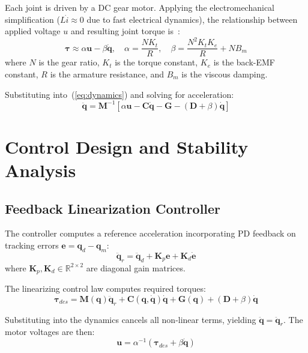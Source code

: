 \documentclass[conference]{IEEEtran}
\begin{document}
Each joint is driven by a DC gear motor. Applying the electromechanical simplification ($L\dot{i} \approx 0$ due to fast electrical dynamics), the relationship between applied voltage $u$ and resulting joint torque is~\cite{siciliano2009}:
\begin{equation}
\boldsymbol{\tau} \approx \alpha\mathbf{u} - \beta\dot{\mathbf{q}}, \quad \alpha = \frac{NK_t}{R}, \quad \beta = \frac{N^2 K_t K_e}{R} + NB_m
\label{eq:actuator}
\end{equation}
where $N$ is the gear ratio, $K_t$ is the torque constant, $K_e$ is the back-EMF constant, $R$ is the armature resistance, and $B_m$ is the viscous damping.

Substituting into~(\ref{eq:dynamics}) and solving for acceleration:
\begin{equation}
\ddot{\mathbf{q}} = \mathbf{M}^{-1}[\alpha\mathbf{u} - \mathbf{C}\dot{\mathbf{q}} - \mathbf{G} - (\mathbf{D}+\beta)\dot{\mathbf{q}}]
\label{eq:combined}
\end{equation}

\section{Control Design and Stability Analysis}
\label{sec:control}

\subsection{Feedback Linearization Controller}

The controller computes a reference acceleration incorporating PD feedback on tracking errors $\mathbf{e} = \mathbf{q}_d - \mathbf{q}_m$:
\begin{equation}
\ddot{\mathbf{q}}_r = \ddot{\mathbf{q}}_d + \mathbf{K}_p\mathbf{e} + \mathbf{K}_d\dot{\mathbf{e}}
\label{eq:ref_accel}
\end{equation}
where $\mathbf{K}_p, \mathbf{K}_d \in \mathbb{R}^{2\times 2}$ are diagonal gain matrices.

The linearizing control law computes required torques:
\begin{equation}
\boldsymbol{\tau}_{des} = \mathbf{M}(\mathbf{q})\ddot{\mathbf{q}}_r + \mathbf{C}(\mathbf{q},\dot{\mathbf{q}})\dot{\mathbf{q}} + \mathbf{G}(\mathbf{q}) + (\mathbf{D}+\beta)\dot{\mathbf{q}}
\label{eq:computed_torque}
\end{equation}

Substituting into the dynamics cancels all non-linear terms, yielding $\ddot{\mathbf{q}} = \ddot{\mathbf{q}}_r$. The motor voltages are then:
\begin{equation}
\mathbf{u} = \alpha^{-1}(\boldsymbol{\tau}_{des} + \beta\dot{\mathbf{q}})
\label{eq:voltage}
\end{equation}
\end{document}
